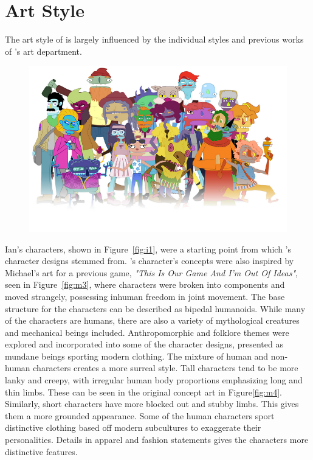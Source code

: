 \section{Art Style}
The art style of \ourgame{} is largely influenced by the individual styles and previous works of \ourteam{}'s art department.

\begin{figure}[H]
\centering\includegraphics[width=0.7\linewidth]{images/art_style}
\end{figure}

\clearpage
Ian's characters, shown in Figure~\ref{fig:i1}, were a starting point from which \ourgame{}'s character designs stemmed from. \ourgame{}'s character's concepts were also inspired by Michael's art for a previous game, \textit{"This Is Our Game And I'm Out Of Ideas"}, seen in Figure~\ref{fig:m3}, where characters were broken into components and moved strangely, possessing inhuman freedom in joint movement. 
The base structure for the characters can be described as bipedal humanoids. While many of the characters are humans, there are also a variety of mythological creatures and mechanical beings included. Anthropomorphic and folklore themes were explored and incorporated into some of the character designs, presented as mundane beings sporting modern clothing. The mixture of human and non-human characters creates a more surreal style. 
Tall characters tend to be more lanky and creepy, with irregular human body proportions emphasizing long and thin limbs. These can be seen in the original concept art in Figure\ref{fig:m4}. Similarly, short characters have more blocked out and stubby limbs. This gives them a more grounded appearance. Some of the human characters sport distinctive clothing based off modern subcultures to exaggerate their personalities. Details in apparel and fashion statements gives the characters more distinctive features.



